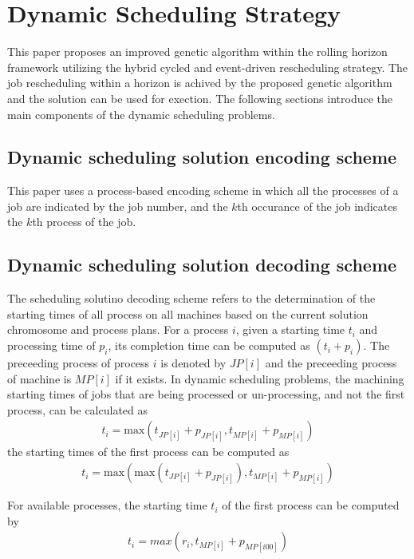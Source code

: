 \section{Dynamic Scheduling Strategy}
This paper proposes an improved genetic algorithm within the rolling horizon framework utilizing the hybrid cycled and event-driven rescheduling strategy.
The job rescheduling within a horizon is achived by the proposed genetic algorithm and the solution can be used for exection.
The following sections introduce the main components of the dynamic scheduling problems.

\subsection{Dynamic scheduling solution encoding scheme}
This paper uses a process-based encoding scheme in which all the processes of a job are indicated by the job number, and the $k$th occurance of the job indicates the $k$th process of the job.

\subsection{Dynamic scheduling solution decoding scheme} 
The scheduling solutino decoding scheme refers to the determination of the starting times of all process on all machines based on the current solution chromosome and process plans.
For a process $i$, given a starting time $t_i$ and processing time of $p_i$, its completion time can be computed as $(t_i + p_i)$.
The preceeding process of process $i$ is denoted by $JP[i]$ and the preceeding process of machine is $MP[i]$ if it exists.
In dynamic scheduling problems, the machining starting times of jobs that are being processed or un-processing, and not the first process, can be calculated as 
\begin{align}
	t_i = \text{max}(t_{JP[i]} + p_{JP[i]}, t_{MP[i]} + p_{MP[i]})
\end{align}
the starting times of the first process can be computed as
\begin{align}
	t_i = \text{max}(\text{max}(t_{JP[i]} + p_{JP[i]}), t_{MP[i]} + p_{MP[i]})
\end{align}

For available processes, the starting time $t_i$ of the first process can be computed by 
\begin{align}
	t_i = max(r_i, t_{MP[i]} + p_{MP[i00]})
\end{align}

